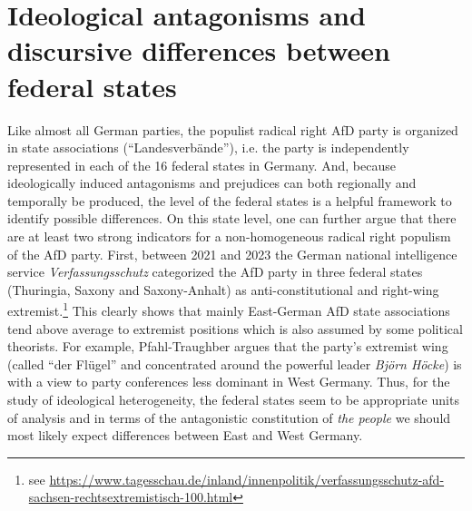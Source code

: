 \documentclass[a4paper]{scrreprt}
\begin{document}
\section{Ideological antagonisms and discursive differences between federal states}
Like almost all German parties, the populist radical right AfD party is organized in state associations (``Landesverbände''), i.e. the party is independently represented in each of the 16 federal states in Germany. And, because ideologically induced antagonisms and prejudices can both regionally and temporally be produced, the level of the federal states is a helpful framework to identify possible differences. On this state level, one can further argue that there are at least two strong indicators for a non-homogeneous radical right populism of the AfD party. First, between 2021 and 2023 the German national intelligence service {\em Verfassungsschutz} categorized the AfD party in three federal states (Thuringia, Saxony and Saxony-Anhalt) as anti-constitutional and right-wing extremist.\footnote{see \url{https://www.tagesschau.de/inland/innenpolitik/verfassungsschutz-afd-sachsen-rechtsextremistisch-100.html}} This clearly shows that mainly East-German AfD state associations tend above average to extremist positions which is also assumed by some political theorists. For example, Pfahl-Traughber argues that the party's extremist wing (called ``der Flügel'' and concentrated around the powerful leader {\em Björn Höcke}) is with a view to party conferences less dominant in West Germany. \cite[p.~37]{pfahl:2019} Thus, for the study of ideological heterogeneity, the federal states seem to be appropriate units of analysis and in terms of the antagonistic constitution of {\em the people} we should most likely expect differences between East and West Germany.\par
\end{document}
